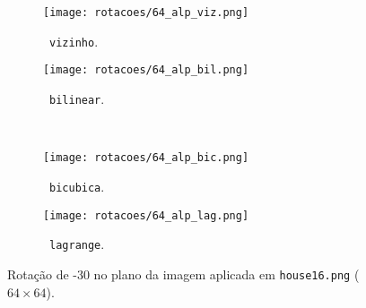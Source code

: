 \begin{figure}[H]
    \centering
    \begin{subfigure}{0.25\textwidth}
        \centering
        \texttt{[image: rotacoes/64\_alp\_viz.png]}
        \caption{~\texttt{vizinho}.}
    \end{subfigure}%
    \hspace{8pt}%
    \begin{subfigure}{0.25\textwidth}
        \centering
        \texttt{[image: rotacoes/64\_alp\_bil.png]}
        \caption{~\texttt{bilinear}.}
    \end{subfigure}
    \\[8pt]
    \begin{subfigure}{0.25\textwidth}
        \centering
        \texttt{[image: rotacoes/64\_alp\_bic.png]}
        \caption{~\texttt{bicubica}.}
    \end{subfigure}%
    \hspace{8pt}%
    \begin{subfigure}{0.25\textwidth}
        \centering
        \texttt{[image: rotacoes/64\_alp\_lag.png]}
        \caption{~\texttt{lagrange}.}
    \end{subfigure}

    \caption{Rotação de -30\textdegree{} no plano da imagem aplicada em \texttt{house16.png} ($64 \times 64$).}
    \label{fig:rot:house64}
\end{figure}